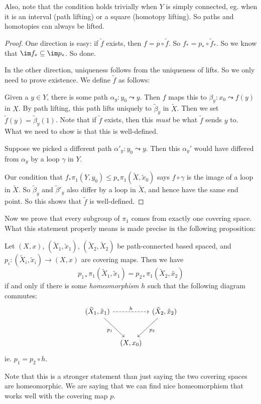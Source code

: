 \documentclass[a4paper]{article}
\begin{document}
Also, note that the condition holds trivially when $Y$ is simply connected, eg. when it is an interval (path lifting) or a square (homotopy lifting). So paths and homotopies can always be lifted.

\begin{proof}
  One direction is easy: if $\tilde{f}$ exists, then $f = p \circ \tilde{f}$. So $f_* = p_* \circ \tilde{f}_*$. So we know that $\im f_* \subseteq \im p_*$. So done.

  In the other direction, uniqueness follows from the uniqueness of lifts. So we only need to prove existence. We define $\tilde{f}$ as follows:

  Given a $y \in Y$, there is some path $\alpha_y: y_0 \leadsto y$. Then $f$ maps this to $\beta_y: x_0 \leadsto f(y)$ in $X$. By path lifting, this path lifts uniquely to $\tilde{\beta}_y$ in $\tilde{X}$. Then we set $\tilde{f}(y) = \tilde{\beta}_y(1)$. Note that if $\tilde{f}$ exists, then this \emph{must} be what $\tilde{f}$ sends $y$ to. What we need to show is that this is well-defined.

  Suppose we picked a different path $\alpha'_y: y_0 \leadsto y$. Then this $\alpha_y'$ would have differed from $\alpha_y$ by a loop $\gamma$ in $Y$.

  Our condition that $f_* \pi_1(Y, y_0) \leq p_*\pi_1(\tilde{X}, \tilde{x}_0)$ says $f\circ \gamma$ is the image of a loop in $\tilde{X}$. So $\tilde{\beta}_y$ and $\tilde{\beta}'_y$ also differ by a loop in $\tilde{X}$, and hence have the same end point. So this shows that $\tilde{f}$ is well-defined.
\end{proof}

Now we prove that every subgroup of $\pi_1$ comes from exactly one covering space. What this statement properly means is made precise in the following proposition:
\begin{prop}
  Let $(X, x)$, $(\tilde{X}_1, \tilde{x}_1)$, $(\tilde{X}_2, \tilde{X}_2)$ be path-connected based spaced, and $p_i: (\tilde{X}_i, \tilde{x}_i) \to (X, x)$ are covering maps. Then we have
  \[
    p_{1*}\pi_1(\tilde{X}_1, \tilde{x}_1) = p_{2*} \pi_1(\tilde{X}_2, \tilde{x_2})
  \]
  if and only if there is some \emph{homeomorphism} $h$ such that the following diagram commutes:
  \[
    \begin{tikzcd}[row sep=large, column sep=tiny]
      (\tilde{X}_1, \tilde{x}_1) \ar[rr, dashed, "h"] \ar[rd, "p_1"'] & & (\tilde{X}_2, \tilde{x}_2) \ar[ld, "p_2"]\\
      & (X, x_0)
    \end{tikzcd}
  \]
  ie. $p_1 = p_2 \circ h$.
\end{prop}
Note that this is a stronger statement than just saying the two covering spaces are homeomorphic. We are saying that we can find nice homeomorphism that works well with the covering map $p$.
\end{document}
